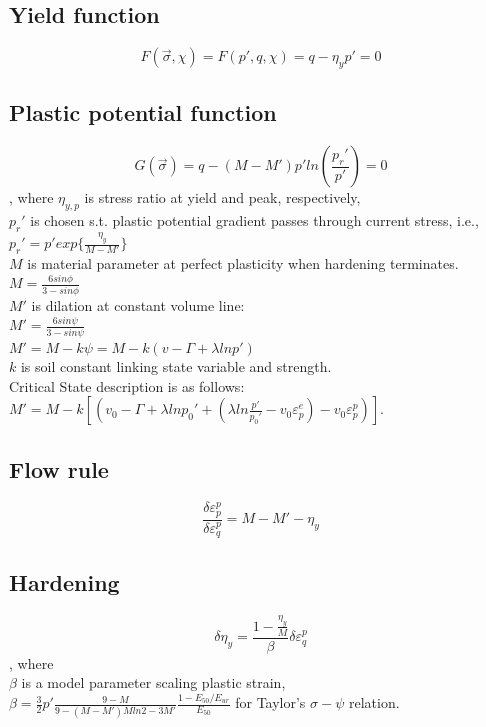 \documentclass[a4paper, nobind]{templates/ociamthesis}
\begin{document}
\hypertarget{yield-function-1}{%
\subsection{Yield function}\label{yield-function-1}}

\[
F(\vec{\sigma}, \chi) = F(p',q,\chi)=q - \eta_y p'=0
\]

\hypertarget{plastic-potential-function-1}{%
\subsection{Plastic potential function}\label{plastic-potential-function-1}}

\[
G(\vec{\sigma}) = q-(M -M') p' ln(\frac{p_r'}{p'})=0
\]
, where
\(\eta_{y,p}\) is stress ratio at yield and peak, respectively,\\
\(p_r'\) is chosen s.t. plastic potential gradient passes through current stress, i.e.,\\
\(p_r' = p' exp \{ \frac{\eta_y}{M-M'} \}\)\\
\(M\) is material parameter at perfect plasticity when hardening terminates.\\
\(M = \frac{6 sin \phi}{3 - sin\phi}\)\\
\(M'\) is dilation at constant volume line:\\
\(M' = \frac{6 sin \psi}{3 - sin\psi}\)\\
\(M' = M - k \psi = M-k(v-\Gamma+\lambda lnp')\)\\
\(k\) is soil constant linking state variable and strength.\\
Critical State description is as follows:\\
\(M' = M - k [(v_0 - \Gamma + \lambda ln p_0' + (\lambda ln \frac{p'}{p_0'}-v_0 \varepsilon_p^e)-v_0\varepsilon_p^p)]\).

\hypertarget{flow-rule}{%
\subsection{Flow rule}\label{flow-rule}}

\[
\frac{\delta \varepsilon_{p}^{p}}{\delta \varepsilon_{q}^{p}} = M -M'- \eta_y
\]

\hypertarget{hardening}{%
\subsection{Hardening}\label{hardening}}

\[
\delta \eta_y = \frac{1-\frac{\eta_y}{M}}{\beta} \delta \varepsilon_q^p
\]
, where\\
\(\beta\) is a model parameter scaling plastic strain,\\
\(\beta = \frac{3}{2}p' \frac{9-M}{9-(M-M')M ln2 - 3M'} \frac{1-E_{50}/E_{ur}}{E_{50}}\) for Taylor's \(\sigma-\psi\) relation.
\end{document}
